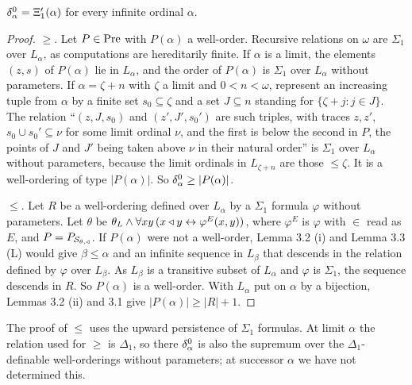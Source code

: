 \documentclass[11pt]{article}
\begin{document}
\begin{statement} $\delta^0_{\alpha} = \Xi'_1(\alpha)$ for every infinite ordinal $\alpha$.
\end{statement}

\begin{proof} $\ge$. Let $P \in \mathrm{Pre}$ with $P(\alpha)$ a well-order. Recursive relations on $\omega$ are $\Sigma_1$
over $L_{\alpha}$, as computations are hereditarily finite. If $\alpha$ is a limit, the elements $(z, s)$ of
$P(\alpha)$ lie in $L_{\alpha}$, and the order of $P(\alpha)$ is $\Sigma_1$ over $L_{\alpha}$ without parameters. If
$\alpha = \zeta + n$ with $\zeta$ a limit and $0 < n < \omega$, represent an increasing tuple from $\alpha$ by a
finite set $s_0 \subseteq \zeta$ and a set $J \subseteq n$ standing for $\{\zeta + j : j \in J\}$. The relation
``$(z, J, s_0)$ and $(z', J', s_0')$ are such triples, with traces $z, z'$, $s_0 \cup s_0' \subseteq \nu$ for some limit ordinal $\nu$,
and the first is below the second in $P$, the points of $J$ and $J'$ being taken above $\nu$ in their natural
order'' is $\Sigma_1$ over $L_{\alpha}$ without parameters, because the limit ordinals in $L_{\zeta + n}$ are
those $\le \zeta$. It is a well-ordering of type $|P(\alpha)|$. So $\delta^0_{\alpha} \ge |P(\alpha)|$.

$\le$. Let $R$ be a well-ordering defined over $L_{\alpha}$ by a $\Sigma_1$ formula $\varphi$ without parameters.
Let $\theta$ be $\theta_L \wedge \forall x y\, (x \triangleleft y \leftrightarrow \varphi^E(x, y))$, where $\varphi^E$ is
$\varphi$ with $\in$ read as $E$, and $P = P_{\mathcal S_{\theta, \triangleleft}}$. If $P(\alpha)$ were not a well-order,
Lemma 3.2 (i) and Lemma 3.3 (L) would give $\beta \le \alpha$ and an infinite sequence in $L_{\beta}$ that descends
in the relation defined by $\varphi$ over $L_{\beta}$. As $L_{\beta}$ is a transitive subset of $L_{\alpha}$ and
$\varphi$ is $\Sigma_1$, the sequence descends in $R$. So $P(\alpha)$ is a well-order. With $L_{\alpha}$ put on
$\alpha$ by a bijection, Lemmas 3.2 (ii) and 3.1 give $|P(\alpha)| \ge |R| + 1$.
\end{proof}

The proof of $\le$ uses the upward persistence of $\Sigma_1$ formulas. At limit $\alpha$ the relation used for
$\ge$ is $\Delta_1$, so there $\delta^0_{\alpha}$ is also the supremum over the $\Delta_1$-definable well-orderings
without parameters; at successor $\alpha$ we have not determined this.
\end{document}
